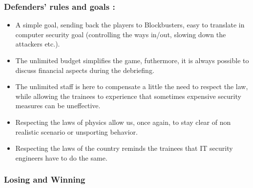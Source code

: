 \documentclass[11pt]{article} %
\begin{document}
\subsubsection{Defenders' rules and goals : }
\begin{itemize}
\item A simple goal, sending back the players to Blockbusters, easy to translate in computer 
security goal (controlling the ways in/out, slowing down the attackers etc.).
\item The unlimited budget simplifies the game, futhermore, it is always possible to discuss 
financial aspects during the debriefing.
\item The unlimited staff is here to compensate a little the need to respect the law, 
while allowing the trainees to experience that sometimes expensive security 
measures can be uneffective.
\item Respecting the laws of physics allow us, once again, to stay clear of non realistic scenario or 
unsporting behavior.
\item Respecting the laws of the country reminds the trainees that IT security 
engineers have to do the same.
\end{itemize}

\subsubsection{Losing and Winning}
\end{document}
